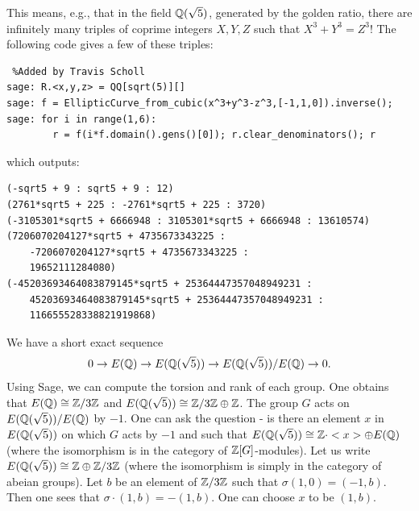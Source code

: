 \documentclass{book}
\begin{document}
This means, e.g., that in the field $\mathbb{Q}(\sqrt{5})$, generated by
the golden ratio, there are infinitely many triples of coprime integers
$X,Y,Z$ such that $X^3 + Y^3 = Z^3$! The following code gives a few of these triples:
\begin{lstlisting} %Added by Travis Scholl
sage: R.<x,y,z> = QQ[sqrt(5)][]
sage: f = EllipticCurve_from_cubic(x^3+y^3-z^3,[-1,1,0]).inverse();
sage: for i in range(1,6):
        r = f(i*f.domain().gens()[0]); r.clear_denominators(); r
\end{lstlisting}
which outputs:
\begin{lstlisting}
(-sqrt5 + 9 : sqrt5 + 9 : 12)
(2761*sqrt5 + 225 : -2761*sqrt5 + 225 : 3720)
(-3105301*sqrt5 + 6666948 : 3105301*sqrt5 + 6666948 : 13610574)
(7206070204127*sqrt5 + 4735673343225 :
    -7206070204127*sqrt5 + 4735673343225 :
    19652111284080)
(-45203693464083879145*sqrt5 + 25364447357048949231 :
    45203693464083879145*sqrt5 + 25364447357048949231 :
    116655528338821919868)
\end{lstlisting}




We have a short exact sequence
\begin{align} \label{seq}
0 \rightarrow E(\mathbb{Q}) \rightarrow E(\mathbb{Q}(\sqrt{5})) \rightarrow E(\mathbb{Q}(\sqrt{5})) / E(\mathbb{Q})  \rightarrow 0.
\end{align}
Using Sage, we can compute the torsion and rank of each group. One obtains that $E(\mathbb{Q}) \cong \mathbb{Z}/3\mathbb{Z}$ and $E(\mathbb{Q}(\sqrt{5})) \cong \mathbb{Z}/3\mathbb{Z} \oplus \mathbb{Z}$. The group $G$ acts on $E(\mathbb{Q}(\sqrt{5})) / E(\mathbb{Q})$ by $-1$. One can ask the question - is there an element $x$ in $E(\mathbb{Q}(\sqrt{5}))$ on which $G$ acts by $-1$ and such that $E(\mathbb{Q}(\sqrt{5})) \cong \mathbb{Z} \cdot <x> \oplus E(\mathbb{Q})$ (where the isomorphism is in the category of $\mathbb{Z}[G]$-modules).
Let us write $E(\mathbb{Q}(\sqrt{5})) \cong \mathbb{Z} \oplus \mathbb{Z}/3\mathbb{Z}$ (where the isomorphism is simply in the category of abeian groups).
Let $b$ be an element of $\mathbb{Z}/3\mathbb{Z}$ such that $\sigma (1,0) = (-1,b)$. Then one sees that $\sigma\cdot (1,b) = -(1,b)$.
One can choose $x$ to be $(1,b)$.
\end{document}
